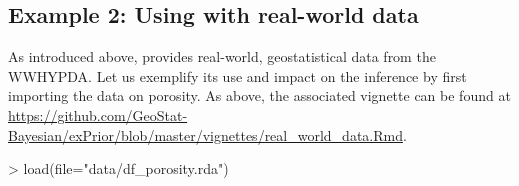 \subsection{Example 2: Using  with real-world data}\label{ssec:using-exPrior}





As introduced above,  provides real-world, geostatistical data from the WWHYPDA.
Let us exemplify its use and impact on the inference by first importing the data on porosity.
As above, the associated vignette can be found at \url{https://github.com/GeoStat-Bayesian/exPrior/blob/master/vignettes/real_world_data.Rmd}.

\begin{example}
> load(file="data/df_porosity.rda")
\end{example}

